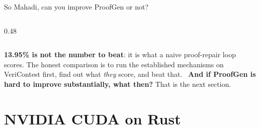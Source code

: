 \documentclass[aspectratio=169,10pt]{beamer}
\newcommand{\hd}[1]{\textbf{\color{lgTeal}#1}}
\begin{document}
\begin{frame}{So Mahadi, can you improve ProofGen or not?}
\begin{columns}[T]
\begin{column}{0.48\textwidth}
\vspace{5pt}
\begin{center}
\end{center}
\end{column}
\end{columns}

\vspace{6pt}
\begin{callout}[lgAccent]
\scriptsize
\textbf{13.95\% is not the number to beat}: it is what a naive proof-repair loop scores. The
honest comparison is to run the established mechanisms on VeriContest first, find out what \emph{they} score, and beat that.
\ \hd{And if ProofGen is hard to improve substantially, what then?} That is the next section.
\end{callout}

\end{frame}

\section{NVIDIA CUDA on Rust}
\end{document}
